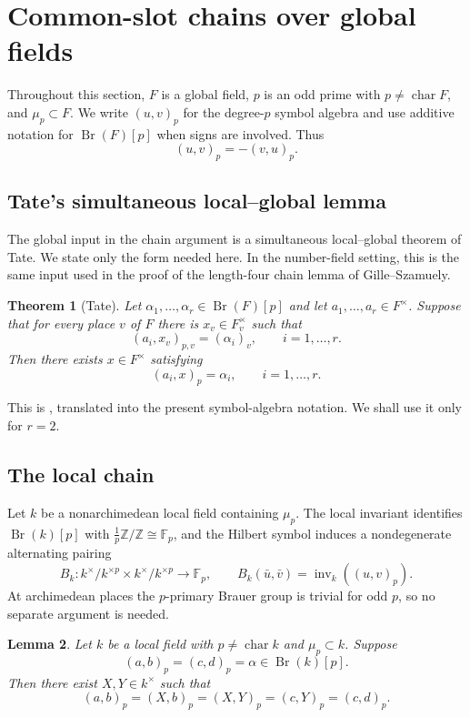 \documentclass[12pt]{amsart}
\newtheorem{theorem}{Theorem}[section]
\newtheorem{lemma}[theorem]{Lemma}
\theoremstyle{definition}
\theoremstyle{remark}
\DeclareMathOperator{\Br}{Br}
\DeclareMathOperator{\inv}{inv}
\newcommand{\Fp}{\mathbb F_p}
\begin{document}
\section{Common-slot chains over global fields}

Throughout this section, $F$ is a global field, $p$ is an odd prime with
$p\neq\operatorname{char}F$, and $\mu_p\subset F$. We write $(u,v)_p$ for
the degree-$p$ symbol algebra and use additive notation for $\Br(F)[p]$ when
signs are involved. Thus
\[
 (u,v)_p=-(v,u)_p.
\]

\subsection{Tate's simultaneous local--global lemma}

The global input in the chain argument is a simultaneous local--global
theorem of Tate. We state only the form needed here. In the number-field
setting, this is the same input used in the proof of the length-four chain
lemma of Gille--Szamuely.

\begin{theorem}[Tate]\label{thm:Tate}
Let $\alpha_1,\ldots,\alpha_r\in\Br(F)[p]$ and let
$a_1,\ldots,a_r\in F^\times$. Suppose that for every place $v$ of $F$
there is $x_v\in F_v^\times$ such that
\[
 (a_i,x_v)_{p,v}=(\alpha_i)_v,
 \qquad i=1,\ldots,r.
\]
Then there exists $x\in F^\times$ satisfying
\[
 (a_i,x)_p=\alpha_i,
 \qquad i=1,\ldots,r.
\]
\end{theorem}

This is \cite[Lemma~5.2]{Tate}, translated into the present
symbol-algebra notation. We shall use it only for $r=2$.

\subsection{The local chain}

Let $k$ be a nonarchimedean local field containing $\mu_p$. The local
invariant identifies $\Br(k)[p]$ with
$\frac1p\mathbb Z/\mathbb Z\cong\Fp$, and the Hilbert symbol induces a
nondegenerate alternating pairing
\[
 B_k:k^\times/k^{\times p}\times k^\times/k^{\times p}
 \longrightarrow\Fp,
 \qquad
 B_k(\bar u,\bar v)=\inv_k((u,v)_p).
\]
At archimedean places the $p$-primary Brauer group is trivial for odd $p$,
so no separate argument is needed.

\begin{lemma}\label{lem:local-chain}
Let $k$ be a local field with $p\neq\operatorname{char}k$ and
$\mu_p\subset k$. Suppose
\[
 (a,b)_p=(c,d)_p=\alpha\in\Br(k)[p].
\]
Then there exist $X,Y\in k^\times$ such that
\[
 (a,b)_p=(X,b)_p=(X,Y)_p=(c,Y)_p=(c,d)_p.
\]
\end{lemma}
\end{document}
